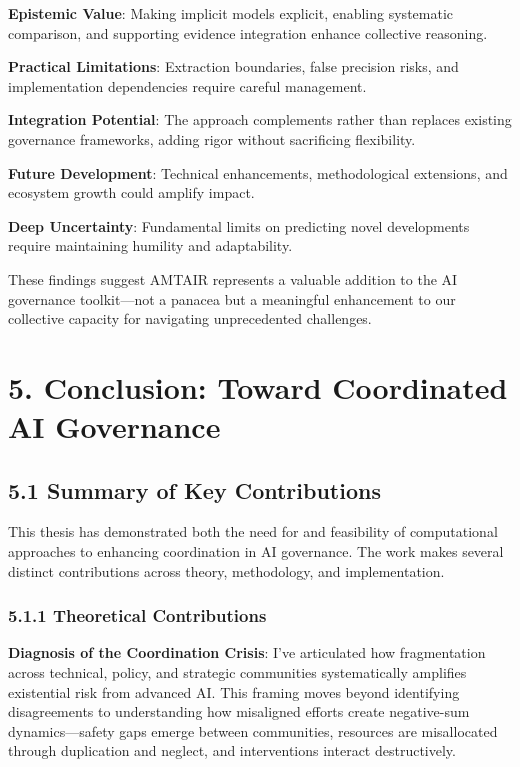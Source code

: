 \documentclass[
  11pt,
  letterpaper,
  openany]{book}
\begin{document}
\textbf{Epistemic Value}: Making implicit models explicit, enabling
systematic comparison, and supporting evidence integration enhance
collective reasoning.

\textbf{Practical Limitations}: Extraction boundaries, false precision
risks, and implementation dependencies require careful management.

\textbf{Integration Potential}: The approach complements rather than
replaces existing governance frameworks, adding rigor without
sacrificing flexibility.

\textbf{Future Development}: Technical enhancements, methodological
extensions, and ecosystem growth could amplify impact.

\textbf{Deep Uncertainty}: Fundamental limits on predicting novel
developments require maintaining humility and adaptability.

These findings suggest AMTAIR represents a valuable addition to the AI
governance toolkit---not a panacea but a meaningful enhancement to our
collective capacity for navigating unprecedented challenges.


\chapter{5. Conclusion: Toward Coordinated AI
Governance}\label{sec-conclusion}

\section{5.1 Summary of Key Contributions}\label{sec-key-contributions}

This thesis has demonstrated both the need for and feasibility of
computational approaches to enhancing coordination in AI governance. The
work makes several distinct contributions across theory, methodology,
and implementation.

\subsection{5.1.1 Theoretical
Contributions}\label{sec-theoretical-contributions}

\textbf{Diagnosis of the Coordination Crisis}: I've articulated how
fragmentation across technical, policy, and strategic communities
systematically amplifies existential risk from advanced AI. This framing
moves beyond identifying disagreements to understanding how misaligned
efforts create negative-sum dynamics---safety gaps emerge between
communities, resources are misallocated through duplication and neglect,
and interventions interact destructively.
\end{document}
